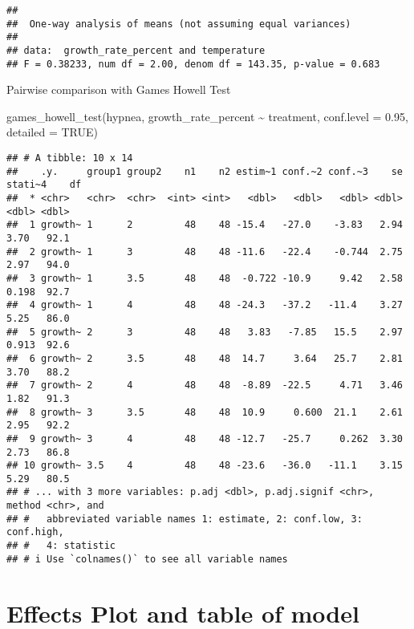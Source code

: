\documentclass[
]{article}
\newenvironment{Shaded}{\begin{snugshade}}{\end{snugshade}}
\newcommand{\AttributeTok}[1]{\textcolor[rgb]{0.77,0.63,0.00}{#1}}
\newcommand{\ConstantTok}[1]{\textcolor[rgb]{0.00,0.00,0.00}{#1}}
\newcommand{\FloatTok}[1]{\textcolor[rgb]{0.00,0.00,0.81}{#1}}
\newcommand{\FunctionTok}[1]{\textcolor[rgb]{0.00,0.00,0.00}{#1}}
\newcommand{\NormalTok}[1]{#1}
\newcommand{\SpecialCharTok}[1]{\textcolor[rgb]{0.00,0.00,0.00}{#1}}
\begin{document}
\begin{verbatim}
## 
##  One-way analysis of means (not assuming equal variances)
## 
## data:  growth_rate_percent and temperature
## F = 0.38233, num df = 2.00, denom df = 143.35, p-value = 0.683
\end{verbatim}

Pairwise comparison with Games Howell Test

\begin{Shaded}
\begin{Highlighting}[]
\FunctionTok{games\_howell\_test}\NormalTok{(hypnea, growth\_rate\_percent }\SpecialCharTok{\textasciitilde{}}\NormalTok{ treatment, }\AttributeTok{conf.level =} \FloatTok{0.95}\NormalTok{, }\AttributeTok{detailed =} \ConstantTok{TRUE}\NormalTok{)}
\end{Highlighting}
\end{Shaded}

\begin{verbatim}
## # A tibble: 10 x 14
##    .y.     group1 group2    n1    n2 estim~1 conf.~2 conf.~3    se stati~4    df
##  * <chr>   <chr>  <chr>  <int> <int>   <dbl>   <dbl>   <dbl> <dbl>   <dbl> <dbl>
##  1 growth~ 1      2         48    48 -15.4   -27.0    -3.83   2.94   3.70   92.1
##  2 growth~ 1      3         48    48 -11.6   -22.4    -0.744  2.75   2.97   94.0
##  3 growth~ 1      3.5       48    48  -0.722 -10.9     9.42   2.58   0.198  92.7
##  4 growth~ 1      4         48    48 -24.3   -37.2   -11.4    3.27   5.25   86.0
##  5 growth~ 2      3         48    48   3.83   -7.85   15.5    2.97   0.913  92.6
##  6 growth~ 2      3.5       48    48  14.7     3.64   25.7    2.81   3.70   88.2
##  7 growth~ 2      4         48    48  -8.89  -22.5     4.71   3.46   1.82   91.3
##  8 growth~ 3      3.5       48    48  10.9     0.600  21.1    2.61   2.95   92.2
##  9 growth~ 3      4         48    48 -12.7   -25.7     0.262  3.30   2.73   86.8
## 10 growth~ 3.5    4         48    48 -23.6   -36.0   -11.1    3.15   5.29   80.5
## # ... with 3 more variables: p.adj <dbl>, p.adj.signif <chr>, method <chr>, and
## #   abbreviated variable names 1: estimate, 2: conf.low, 3: conf.high,
## #   4: statistic
## # i Use `colnames()` to see all variable names
\end{verbatim}

\hypertarget{effects-plot-and-table-of-model}{%
\section{Effects Plot and table of
model}\label{effects-plot-and-table-of-model}}
\end{document}

